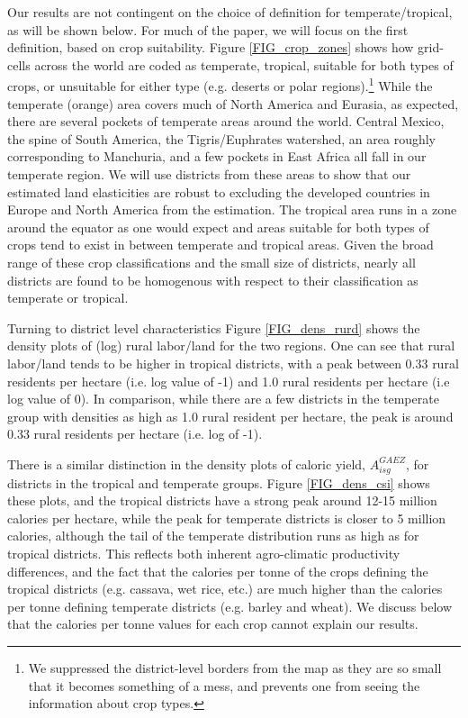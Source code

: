 \documentclass[12pt]{article}
\begin{document}
\vspace{.5cm} 
Our results are not contingent on the choice of definition for temperate/tropical, as will be shown below. For much of the paper, we will focus on the first definition, based on crop suitability. Figure \ref{FIG_crop_zones} shows how grid-cells across the world are coded as temperate, tropical, suitable for both types of crops, or unsuitable for either type (e.g. deserts or polar regions).\footnote{We suppressed the district-level borders from the map as they are so small that it becomes something of a mess, and prevents one from seeing the information about crop types.} While the temperate (orange) area covers much of North America and Eurasia, as expected, there are several pockets of temperate areas around the world. Central Mexico, the spine of South America, the Tigris/Euphrates watershed, an area roughly corresponding to Manchuria, and a few pockets in East Africa all fall in our temperate region. We will use districts from these areas to show that our estimated land elasticities are robust to excluding the developed countries in Europe and North America from the estimation. The tropical area runs in a zone around the equator as one would expect and areas suitable for both types of crops tend to exist in between temperate and tropical areas. Given the broad range of these crop classifications and the small size of districts, nearly all districts are found to be homogenous with respect to their classification as temperate or tropical.

Turning to district level characteristics Figure \ref{FIG_dens_rurd} shows the density plots of (log) rural labor/land for the two regions. One can see that rural labor/land tends to be higher in tropical districts, with a peak between 0.33 rural residents per hectare (i.e. log value of -1) and 1.0 rural residents per hectare (i.e log value of 0). In comparison, while there are a few districts in the temperate group with densities as high as 1.0 rural resident per hectare, the peak is around 0.33 rural residents per hectare (i.e. log of -1). 

There is a similar distinction in the density plots of caloric yield, $A_{isg}^{GAEZ}$, for districts in the tropical and temperate groups. Figure \ref{FIG_dens_csi} shows these plots, and the tropical districts have a strong peak around 12-15 million calories per hectare, while the peak for temperate districts is closer to 5 million calories, although the tail of the temperate distribution runs as high as for tropical districts. This reflects both inherent agro-climatic productivity differences, and the fact that the calories per tonne of the crops defining the tropical districts (e.g. cassava, wet rice, etc.) are much higher than the calories per tonne defining temperate districts (e.g. barley and wheat). We discuss below that the calories per tonne values for each crop cannot explain our results.
\end{document}
